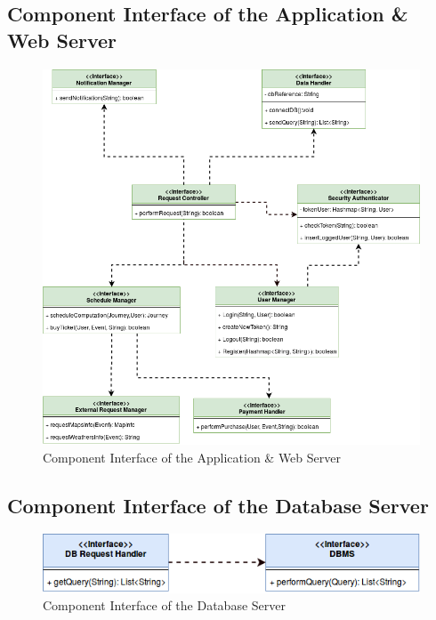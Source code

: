 \documentclass[numbers=noenddot, 12pt, a4paper, oneside]{scrbook}
\begin{document}
\subsection*{Component Interface of the Application \& Web Server}


\begin{figure}[H]
	\centering
	\includegraphics[width=1\textwidth]{images/ApplicationInterface}
	\caption{Component Interface of the Application \& Web Server}
\end{figure}

\subsection*{Component Interface of the Database Server}

\begin{figure}[H]
	\centering
	\includegraphics[width=1\textwidth]{images/DatabaseInterface}
	\caption{Component Interface of the Database Server}
\end{figure}
\end{document}
